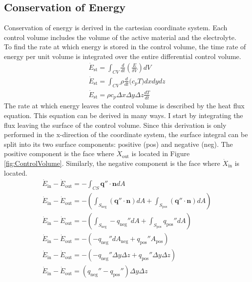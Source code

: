 \documentclass[12pt]{article}
\begin{document}
	\subsection{Conservation of Energy}
		Conservation of energy is derived in the cartesian coordinate system. Each control volume includes the volume of the active material and the electrolyte. \\
		To find the rate at which energy is stored in the control volume, the time rate of energy per unit volume is integrated over the entire differential control volume. 
		\begin{gather} 
			\dot{E}_\text{st} = \int_{CV} \frac{d}{dt}\left( \frac{E}{\delta V} \right) dV \\
			\dot{E}_\text{st} = \int_{CV} \rho \frac{d}{dt}\Big( c_p T \Big) dxdydz \\
			\dot{E}_\text{st} =  \rho c_p \Delta x \Delta y \Delta z \frac{dT}{dt}
		\end{gather}
		The rate at which energy leaves the control volume is described by the heat flux equation. This equation can be derived in many ways. I start by integrating the flux leaving the surface of the control volume. Since this derivation is only performed in the x-direction of the coordinate system, the surface integral can be split into its two surface components: positive (pos) and negative (neg). The positive component is the face where $\dot{X}_\text{out}$ is located in Figure \ref{fig:ControlVolume}. Similarly, the negative component is the face where $\dot{X}_\text{in}$ is located.
		\begin{gather}
			\dot{E}_\text{in} - \dot{E}_\text{out} = - \int_{CS} \mathbf{q}'' \cdot \mathbf{n} dA\\
			\dot{E}_\text{in} - \dot{E}_\text{out} = - \left(\int_{S_\text{neg}} (\mathbf{q}'' \cdot \mathbf{n}) dA + \int_{S_\text{pos}} (\mathbf{q}'' \cdot \mathbf{n}) dA\right)\\
			\dot{E}_\text{in} - \dot{E}_\text{out} = - \left(\int_{S_\text{neg}} -q_\text{neg}'' dA + \int_{S_\text{pos}} q_\text{pos}'' dA\right)\\
			\dot{E}_\text{in} - \dot{E}_\text{out} = - \left(-q_\text{neg}'' dA_\text{neg}  + q_\text{pos}'' A_\text{pos} \right)\\
			\dot{E}_\text{in} - \dot{E}_\text{out} = - \left(-q_\text{neg}'' \Delta y \Delta z  + q_\text{pos}'' \Delta y \Delta z \right)\\
			\dot{E}_\text{in} - \dot{E}_\text{out} = \left(q_\text{neg}'' - q_\text{pos}''  \right)\Delta y \Delta z
		\end{gather}
\end{document}
